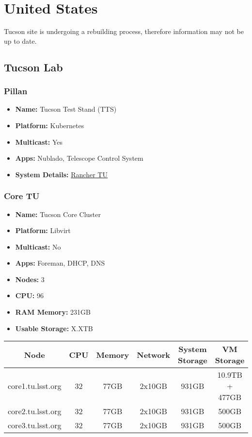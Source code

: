 \newpage
\section{United States}
\vspace*{-\baselineskip}
Tucson site is undergoing a rebuilding process, therefore information may not be up to date.
\subsection{Tucson Lab}
\subsubsection{Pillan}
\begin{itemize}
  \itemsep0em 
  \item \textbf{Name:}       Tucson Test Stand (TTS)
  \item \textbf{Platform:}   Kubernetes
  \item \textbf{Multicast:}  Yes
  \item \textbf{Apps:}       Nublado, Telescope Control System
  \item \textbf{System Details:} \href{https://rancher.tu.lsst.org}{Rancher TU}  

\end{itemize}

\subsubsection{Core TU}
\begin{itemize}
  \itemsep0em 
  \item \textbf{Name:}       Tucson Core Cluster
  \item \textbf{Platform:}   Libvirt
  \item \textbf{Multicast:}  No
  \item \textbf{Apps:}       Foreman, DHCP, DNS
  \item \textbf{Nodes:}      3
  \item \textbf{CPU:}        96
  \item \textbf{RAM Memory:} 231GB
  \item \textbf{Usable Storage:} X.XTB
\end{itemize}
\begin{center}
  \small
  \begin{tabular}{||c c c c c c||}
    \hline
    \textbf{Node} & \textbf{CPU} & \textbf{Memory} & \textbf{Network} & \textbf{System Storage} & \textbf{VM Storage} \\ [0.5ex]
    \hline
    core1.tu.lsst.org & 32 & 77GB & 2x10GB & 931GB & 10.9TB + 477GB \\
    \hline
    core2.tu.lsst.org & 32 & 77GB & 2x10GB & 931GB & 500GB \\
    \hline
    core3.tu.lsst.org & 32 & 77GB & 2x10GB & 931GB & 500GB \\
    \hline
  \end{tabular}
\end{center}